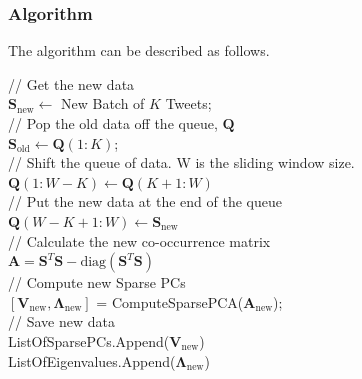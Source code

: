 \documentclass[11pt,a4paper]{article}
\newcommand{\smat}{\mathbf{S}}
\newcommand{\covmat}{\mathbf{A}}
\newcommand{\tp}{^T}
\begin{document}
\subsubsection{Algorithm}
The algorithm can be described as follows.

\LinesNumbered
\begin{algorithm}[H]
 {
// Get the new data\\
$\smat_\text{new} \leftarrow $ New Batch of $K$ Tweets;\\
// Pop the old data off the queue, $\mathbf{Q}$\\
$\smat_\text{old} \leftarrow \mathbf{Q}(1:K)$;\\
// Shift the queue of data. W is the sliding window size.\\
$ \mathbf{Q}(1:W-K) \leftarrow \mathbf{Q}(K+1:W) $\\
// Put the new data at the end of the queue\\
$ \mathbf{Q}(W-K+1:W) \leftarrow \smat_\text{new}$\\
// Calculate the new co-occurrence matrix
\\
$\covmat = \smat\tp \smat - \text{diag}(\smat\tp \smat) $\\
// Compute new Sparse PCs\\
$[\mathbf{V}_\text{new}, \mathbf{\Lambda}_\text{new}]$ = ComputeSparsePCA($\covmat_\text{new}$);\\
// Save new data\\
ListOfSparsePCs.Append($\mathbf{V}_\text{new}$)\\
ListOfEigenvalues.Append($\mathbf{\Lambda}_\text{new}$)\\

}
\end{algorithm}
\end{document}

